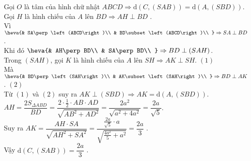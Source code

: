 \begin{ex}
{\begin{center}
		\end{center}
		Gọi $O$ là tâm của hình chữ nhật $ABCD\Rightarrow \mathrm{d}(C,(SAB))=\mathrm{d}\left(A,\left(SBD\right)\right)$.\\
		Gọi $H$ là hình chiếu của $A$ lên $BD\Rightarrow AH\perp BD$ .\\
		Vì $\heva{& SA\perp\left(ABCD\right)\\ 
			& BD\subset\left(ABCD\right)\\ }\Rightarrow SA\perp BD$.\\
		Khi đó $\heva{& AH\perp BD\\ 
			& SA\perp BD\\ }\Rightarrow BD\perp\left(SAH\right)$.\\
		Trong $\left(SAH\right)$, gọi $K$ là hình chiếu của $A$ lên $SH\Rightarrow AK\perp SH$. $(1)$\\
		Mà $\heva{& BD\perp\left(SAH\right)\\ 
			& AK\subset\left(SAH\right)\\ }\Rightarrow BD\perp AK$. $(2)$\\
		Từ $(1)$ và $(2)$ suy ra $AK\perp\left(SBD\right)\Rightarrow AK=\mathrm{d}\left(A,\left(SBD\right)\right)$.\\
		$AH=\dfrac{2S_{\Delta ABD}}{BD}=\dfrac{2\cdot\tfrac{1}{2}\cdot AB\cdot AD}{\sqrt{A{B^2}+A{D^2}}}=\dfrac{2a^2}{\sqrt{a^2+4a^2}}=\dfrac{2a}{\sqrt{5}}$.\\ Suy ra $AK=\dfrac{AH\cdot SA}{\sqrt{AH^2+SA^2}}=\dfrac{\tfrac{2a}{\sqrt{5}}\cdot a}{\sqrt{\tfrac{4a^2}{5}+a^2}}=\dfrac{2a}{3}$ .\\
		Vậy $\mathrm{d}(C,(SAB))=\dfrac{2a}{3}$ .
	}
\end{ex}

